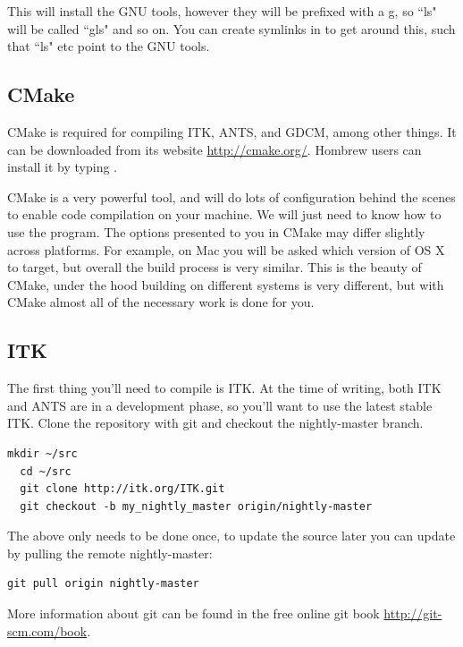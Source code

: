 \documentclass{InsightArticle}
\begin{document}
This will install the GNU tools, however they will be prefixed with a g, so ``ls" will be called ``gls" and so on. You can create symlinks in  to get around this, such that ``ls" etc point to the GNU tools.    


\subsection{CMake}

CMake is required for compiling ITK, ANTS, and GDCM, among other things. It can be downloaded from its website \url{http://cmake.org/}. Hombrew users can install it by typing .

CMake is a very powerful tool, and will do lots of configuration behind the scenes to enable code compilation on your machine. We will just need to know how to use the  program. The options presented to you in CMake may differ slightly across platforms. For example, on Mac you will be asked which version of OS X to target, but overall the build process is very similar. This is the beauty of CMake, under the hood building on different systems is very different, but with CMake almost all of the necessary work is done for you.


\subsection{ITK}

The first thing you'll need to compile is ITK. At the time of writing, both ITK and ANTS are in a development phase, so you'll want to use the latest stable ITK. Clone the repository with git and checkout the nightly-master branch.
\begin{lstlisting}[style=bash]
  mkdir ~/src
  cd ~/src
  git clone http://itk.org/ITK.git
  git checkout -b my_nightly_master origin/nightly-master
\end{lstlisting}
The above only needs to be done once, to update the source later you can update by pulling the remote nightly-master:
\begin{lstlisting}[style=bash]
  git pull origin nightly-master
\end{lstlisting}

More information about git can be found in the free online git book \url{http://git-scm.com/book}.
\end{document}
